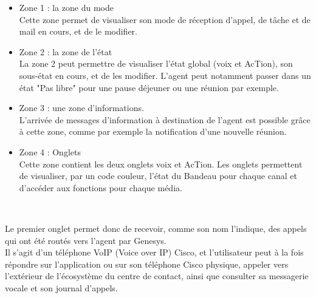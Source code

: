 \documentclass{rapport}
\begin{document}
\vspace{5mm} %
\begin{minipage}{0.25\textwidth}
\end{minipage}
\begin{minipage}{0.65\textwidth}

\begin{itemize}
\item Zone 1 : la zone du mode \\
Cette zone permet de visualiser son mode de réception d’appel, de tâche et de mail en cours, et de le modifier.\\

\item Zone 2 : la zone de l’état\\
La zone 2 peut permettre de visualiser l’état global (voix et AcTion), son sous-état en cours, et de les modifier. L'agent peut notamment passer dans un état "Pas libre" pour une pause déjeuner ou une réunion par exemple.\\

\item Zone 3 : une zone d’informations.\\
L'arrivée de messages d'information à destination de l'agent est possible grâce à cette zone, comme par exemple la notification d'une nouvelle réunion. \\

\item Zone 4 : Onglets\\
Cette zone contient les deux onglets voix et AcTion. 
Les onglets permettent de visualiser, par un code couleur, l’état du Bandeau pour chaque canal et d’accéder aux fonctions pour chaque média.
\end{itemize}

\end{minipage}
\vspace{10mm} %
\noindent
\\

\vspace{5mm} %
\begin{minipage}{0.65\textwidth}
Le premier onglet permet donc de recevoir, comme son nom l'indique, des appels qui ont été routés vers l'agent par Genesys. \\

Il s'agit d'un téléphone VoIP (Voice over IP) Cisco, et l'utilisateur peut à la fois répondre sur l'application ou sur son téléphone Cisco physique, appeler vers l'extérieur de l'écosystème du centre de contact, ainsi que consulter sa messagerie vocale et son journal d'appels.\\

\end{minipage}
\begin{minipage}{0.25\textwidth}
\end{minipage}
\vspace{5mm} %
\noindent
\\
\end{document}
